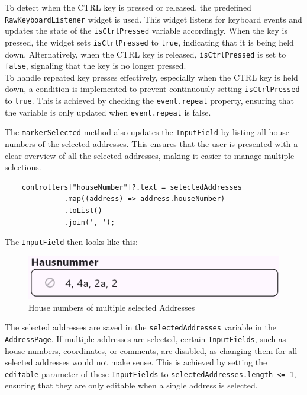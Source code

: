 To detect when the CTRL key is pressed or released, the predefined \texttt{RawKeyboardListener} widget is used. This widget listens for keyboard events and updates the state of the \texttt{isCtrlPressed} variable accordingly. When the key is pressed, the widget sets \texttt{isCtrlPressed} to \texttt{true}, indicating that it is being held down. Alternatively, when the CTRL key is released, \texttt{isCtrlPressed} is set to \texttt{false}, signaling that the key is no longer pressed.\\

To handle repeated key presses effectively, especially when the CTRL key is held down, a condition is implemented to prevent continuously setting \texttt{isCtrlPressed} to \texttt{true}. This is achieved by checking the \texttt{event.repeat} property, ensuring that the variable is only updated when \texttt{event.repeat} is false.
\newpage



The \texttt{markerSelected} method also updates the \texttt{InputField} by listing all house numbers of the selected addresses. This ensures that the user is presented with a clear overview of all the selected addresses, making it easier to manage multiple selections.


\lstset{style=mycsharp, caption=Listed house numbers for multiple selected Addresses}
\begin{lstlisting}
    controllers["houseNumber"]?.text = selectedAddresses
              .map((address) => address.houseNumber)
              .toList()
              .join(', ');
\end{lstlisting}

The \texttt{InputField} then looks like this:
\begin{figure}[H]
    \centering
    \includegraphics[width=0.6\linewidth]{images/AdminPanel/listedHouseNumbersInputField.png}
    \caption{House numbers of multiple selected Addresses}
\end{figure}

The selected addresses are saved in the \texttt{selectedAddresses} variable in the \texttt{AddressPage}. If multiple addresses are selected, certain \texttt{InputFields}, such as house numbers, coordinates, or comments, are disabled, as changing them for all selected addresses would not make sense. This is achieved by setting the \texttt{editable} parameter of these \texttt{InputFields} to \texttt{selectedAddresses.length <= 1}, ensuring that they are only editable when a single address is selected.


